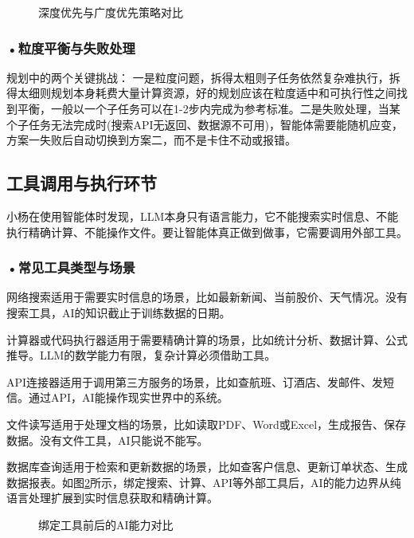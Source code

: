 \begin{figure}[H]
\centering
{}
\caption{深度优先与广度优先策略对比}
\label{fig:ch3_3_24}
\end{figure}


\subsubsection*{\textbf{•粒度平衡与失败处理}}
规划中的两个关键挑战：
一是粒度问题，拆得太粗则子任务依然复杂难执行，拆得太细则规划本身耗费大量计算资源，好的规划应该在粒度适中和可执行性之间找到平衡，一般以一个子任务可以在1-2步内完成为参考标准。二是失败处理，当某个子任务无法完成时(搜索API无返回、数据源不可用)，智能体需要能随机应变，方案一失败后自动切换到方案二，而不是卡住不动或报错。



\subsection{工具调用与执行环节}

小杨在使用智能体时发现，LLM本身只有语言能力，它不能搜索实时信息、不能执行精确计算、不能操作文件。要让智能体真正做到做事，它需要调用外部工具。 


\subsubsection*{\textbf{•常见工具类型与场景}}

网络搜索适用于需要实时信息的场景，比如最新新闻、当前股价、天气情况。没有搜索工具，AI的知识截止于训练数据的日期。

计算器或代码执行器适用于需要精确计算的场景，比如统计分析、数据计算、公式推导。LLM的数学能力有限，复杂计算必须借助工具。

API连接器适用于调用第三方服务的场景，比如查航班、订酒店、发邮件、发短信。通过API，AI能操作现实世界中的系统。

文件读写适用于处理文档的场景，比如读取PDF、Word或Excel，生成报告、保存数据。没有文件工具，AI只能说不能写。

数据库查询适用于检索和更新数据的场景，比如查客户信息、更新订单状态、生成数据报表。如图\ref{fig:ch3_3_25}所示，绑定搜索、计算、API等外部工具后，AI的能力边界从纯语言处理扩展到实时信息获取和精确计算。

\begin{figure}[H]
\centering
{}
\caption{绑定工具前后的AI能力对比}
\label{fig:ch3_3_25}
\end{figure}


